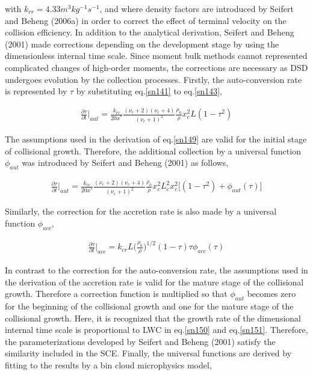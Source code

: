 with $k_{rr} = 4.33 m^{3}kg^{-1}s^{-1}$, and where density factors are introduced by Seifert and Beheng (2006a) in order to correct the effect of terminal velocity on the collision efficiency. In addition to the analytical derivation, Seifert and Beheng (2001) made corrections depending on the development stage by using the dimensionless internal time scale. Since moment bulk methods cannot represented complicated changes of high-order moments, the corrections are necessary as DSD undergoes evolution by the collection processes. Firstly, the auto-conversion rate is represented by $\tau$ by substituting eq.\ref{sn141} to eq.\ref{sn143},

\begin{eqnarray}
\frac{\partial \tau}{\partial t}\Bigr|_{aut}=\frac{k_{cc}}{20x^{*}}\frac{(\nu_{c}+2)(\nu_{c}+4)}{(\nu_{c}+1)^{2}}\frac{\rho_{0}}{\rho}x_{c}^{2}L(1-\tau^{2})\label{sn149}
\end{eqnarray}

The assumptions used in the derivation of eq.\ref{sn149} are valid for the initial stage of collisional growth. Therefore, the additional collection by a universal function $\phi_{aut}$ was introduced by Seifert and Beheng (2001) as follows,

\begin{eqnarray}
\frac{\partial \tau}{\partial t}\Bigr|_{aut}=\frac{k_{cc}}{20x^{*}}\frac{(\nu_{c}+2)(\nu_{c}+4)}{(\nu_{c}+1)^{2}}\frac{\rho_{0}}{\rho}x_{c}^{2}L_{c}^{2}x_{c}^{2}\bigl[(1-\tau^{2})+\phi_{aut}(\tau)\bigr]\label{sn150}
\end{eqnarray}

Similarly, the correction for the accretion rate is also made by a universal function $\phi_{acc}$,

\begin{eqnarray}
\frac{\partial \tau}{\partial t}\Bigr|_{acc}=k_{cr}L\bigl(\frac{\rho_{0}}{\rho}\bigr)^{1/2}(1-\tau)\tau\phi_{acc}(\tau)\label{sn151}
\end{eqnarray}

In contrast to the correction for the auto-conversion rate, the assumptions used in the derivation of the accretion rate is valid for the mature stage of the collisional growth. Therefore a correction function is multiplied so that $\phi_{aut}$ becomes zero for the beginning of the collisional growth and one for the mature stage of the collisional growth. Here, it is recognized that the growth rate of the dimensional internal time scale is proportional to LWC in eq.\ref{sn150} and eq.\ref{sn151}. Therefore, the parameterizations developed by Seifert and Beheng (2001) satisfy the similarity included in the SCE. Finally, the universal functions are derived by fitting to the results by a bin cloud microphysics model,

